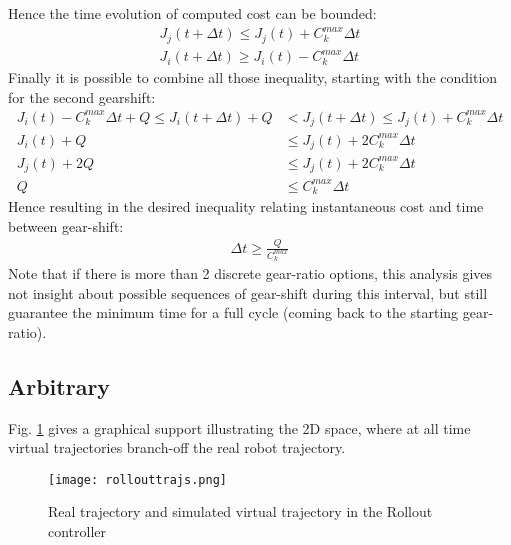 %
Hence the time evolution of computed cost can be bounded:
%
\begin{align}
J_j(t+\Delta t) \leq J_j(t)  + C_k^{max} \Delta t \\
J_i(t+\Delta t) \geq J_i(t)  - C_k^{max} \Delta t 
\end{align}
%
Finally it is possible to combine all those inequality, starting with the condition for the second gearshift:
%
\begin{align}
J_i(t)  - C_k^{max} \Delta t + Q \leq J_i(t+\Delta t) + Q &< J_j(t+\Delta t) \leq J_j(t)  + C_k^{max} \Delta t \\
J_i(t) + Q &\leq J_j(t)  + 2 C_k^{max} \Delta t \\
J_j(t) + 2 Q &\leq J_j(t)  + 2 C_k^{max} \Delta t \\
Q &\leq C_k^{max} \Delta t 
\end{align}
%
Hence resulting in the desired inequality relating instantaneous cost and time between gear-shift:
%
\begin{align}
\Delta t \geq \frac{Q}{C_k^{max}}
\end{align}
%
Note that if there is more than 2 discrete gear-ratio options, this analysis gives not insight about possible sequences of gear-shift during this interval, but still guarantee the minimum time for a full cycle (coming back to the starting gear-ratio).







\subsection{Arbitrary}
\label{sec:chat2}

Fig. \ref{fig:rollouttrajs} gives a graphical support illustrating the 2D space, where at all time virtual trajectories branch-off the real robot trajectory.

\begin{figure}[H]
	\centering
		\texttt{[image: rollouttrajs.png]}
	\caption{Real trajectory and simulated virtual trajectory in the Rollout controller}
	\label{fig:rollouttrajs}
\end{figure}


